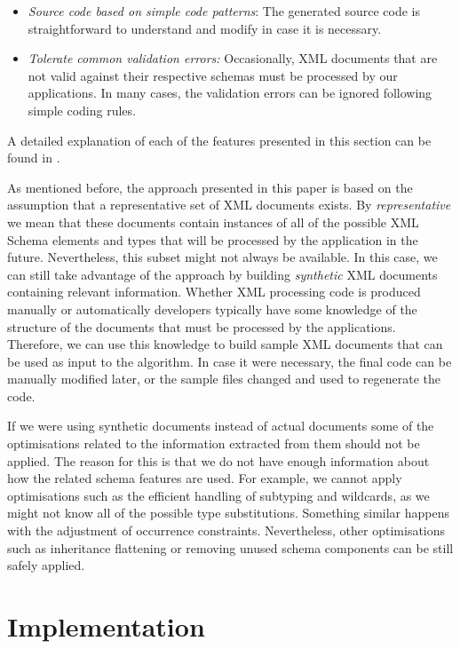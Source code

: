 \documentclass{sig-alternate}
\begin{document}
\begin{itemize}
\item \textit{Source code based on simple code patterns}: The generated source code is straightforward to understand and modify in case it is necessary.
\item \textit{Tolerate common validation errors:} Occasionally,  XML documents that are not valid against their respective schemas must be processed by our applications. In many cases, the validation errors can be ignored following simple coding rules.
\end{itemize}

A detailed explanation of each of the features presented in this section can be found in \cite{thesis:tamayo}.

As mentioned before, the approach presented in this paper is based on the assumption that a representative set of XML documents exists. By \textit{representative} we mean that these documents contain instances of all of the possible XML Schema elements and types that will be processed by the application in the future. Nevertheless, this subset might not always be available. In this case, we can still take advantage of the approach by building \textit{synthetic} XML documents containing relevant information. Whether XML processing code is produced manually or automatically developers typically have some knowledge of the structure of the documents that must be processed by the applications. Therefore, we can use this knowledge to build  sample XML documents that can be used as input to the algorithm. In case it were necessary, the final code can be manually modified later, or the sample files changed and used to regenerate the code.

If we were using synthetic documents instead of actual documents some of the optimisations related to the information extracted from them should not be applied. The reason for this is that  we do not have enough information about how the related schema features are used. For example, we cannot apply optimisations such as the efficient handling of subtyping and wildcards, as we might not know all of the possible type substitutions. Something similar happens with the adjustment of occurrence constraints. Nevertheless, other optimisations such as inheritance flattening or removing  unused schema components can be still safely applied.

\section{Implementation}
\end{document}
